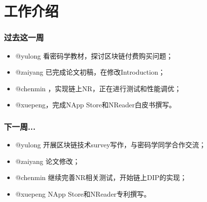 \section{工作介绍}
\begin{frame}
\frametitle{过去这一周}
\begin{itemize}
  \item @yulong 看密码学教材，探讨区块链付费购买问题；
  \item @zaiyang 已完成论文初稿，在修改Introduction；
  \item @chenmin ，实现链上NR，正在进行测试和性能调优；
  \item @xuepeng，完成NApp Store和NReader白皮书撰写。
\end{itemize}

\end{frame}

\begin{frame}
\frametitle{下一周...}
\begin{itemize}
\item @yulong 开展区块链技术survey写作，与密码学同学合作交流；
\item @zaiyang 论文修改；
\item @chenmin 继续完善NR相关测试，开始链上DIP的实现；
\item @xuepeng NApp Store和NReader专利撰写。
\end{itemize}
\end{frame}
